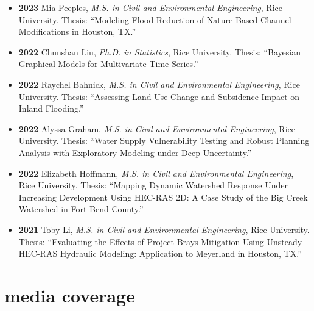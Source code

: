 \documentclass[10pt,oneside]{article}
\begin{document}
\begin{itemize}[label={}]
    \item \textbf{2023} \quad Mia Peeples, \textit{M.S. in Civil and Environmental Engineering}, Rice University. Thesis: \enquote{Modeling Flood Reduction of Nature-Based Channel Modifications in Houston, TX.}
  
    \item \textbf{2022} \quad Chunshan Liu, \textit{Ph.D. in Statistics}, Rice University. Thesis: \enquote{Bayesian Graphical Models for Multivariate Time Series.}
  
    \item \textbf{2022} \quad Raychel Bahnick, \textit{M.S. in Civil and Environmental Engineering}, Rice University. Thesis: \enquote{Assessing Land Use Change and Subsidence Impact on Inland Flooding.}
  
    \item \textbf{2022} \quad Alyssa Graham, \textit{M.S. in Civil and Environmental Engineering}, Rice University. Thesis: \enquote{Water Supply Vulnerability Testing and Robust Planning Analysis with Exploratory Modeling under Deep Uncertainty.}
  
    \item \textbf{2022} \quad Elizabeth Hoffmann, \textit{M.S. in Civil and Environmental Engineering}, Rice University. Thesis: \enquote{Mapping Dynamic Watershed Response Under Increasing Development Using HEC-RAS 2D: A Case Study of the Big Creek Watershed in Fort Bend County.}
  
    \item \textbf{2021} \quad Toby Li, \textit{M.S. in Civil and Environmental Engineering}, Rice University. Thesis: \enquote{Evaluating the Effects of Project Brays Mitigation Using Unsteady HEC-RAS Hydraulic Modeling: Application to Meyerland in Houston, TX.}
  
\end{itemize}


\section{media coverage}

\mbox{}\vspace{-\dimexpr\baselineskip\relax}
\end{document}
